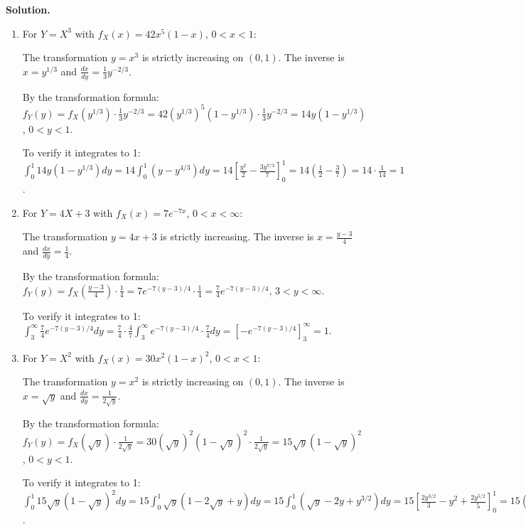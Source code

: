 \noindent\textbf{Solution.}
\begin{enumerate}[label=(\alph*)]
    \item For $Y = X^3$ with $f_X(x) = 42x^5(1-x)$, $0 < x < 1$:
    
    The transformation $y = x^3$ is strictly increasing on $(0,1)$. The inverse is $x = y^{1/3}$ and $\frac{dx}{dy} = \frac{1}{3}y^{-2/3}$.
    
    By the transformation formula: $f_Y(y) = f_X(y^{1/3}) \cdot \frac{1}{3}y^{-2/3} = 42(y^{1/3})^5(1-y^{1/3}) \cdot \frac{1}{3}y^{-2/3} = 14y(1-y^{1/3})$, $0 < y < 1$.
    
    To verify it integrates to 1:
    $\int_0^1 14y(1-y^{1/3})dy = 14\int_0^1 (y-y^{4/3})dy = 14\left[\frac{y^2}{2} - \frac{3y^{7/3}}{7}\right]_0^1 = 14\left(\frac{1}{2} - \frac{3}{7}\right) = 14 \cdot \frac{1}{14} = 1$.
    
    \item For $Y = 4X + 3$ with $f_X(x) = 7e^{-7x}$, $0 < x < \infty$:
    
    The transformation $y = 4x + 3$ is strictly increasing. The inverse is $x = \frac{y-3}{4}$ and $\frac{dx}{dy} = \frac{1}{4}$.
    
    By the transformation formula: $f_Y(y) = f_X\left(\frac{y-3}{4}\right) \cdot \frac{1}{4} = 7e^{-7(y-3)/4} \cdot \frac{1}{4} = \frac{7}{4}e^{-7(y-3)/4}$, $3 < y < \infty$.
    
    To verify it integrates to 1:
    $\int_3^\infty \frac{7}{4}e^{-7(y-3)/4}dy = \frac{7}{4} \cdot \frac{4}{7} \int_3^\infty e^{-7(y-3)/4} \cdot \frac{7}{4}dy = \left[-e^{-7(y-3)/4}\right]_3^\infty = 1$.
    
    \item For $Y = X^2$ with $f_X(x) = 30x^2(1-x)^2$, $0 < x < 1$:
    
    The transformation $y = x^2$ is strictly increasing on $(0,1)$. The inverse is $x = \sqrt{y}$ and $\frac{dx}{dy} = \frac{1}{2\sqrt{y}}$.
    
    By the transformation formula: $f_Y(y) = f_X(\sqrt{y}) \cdot \frac{1}{2\sqrt{y}} = 30(\sqrt{y})^2(1-\sqrt{y})^2 \cdot \frac{1}{2\sqrt{y}} = 15\sqrt{y}(1-\sqrt{y})^2$, $0 < y < 1$.
    
    To verify it integrates to 1:
    $\int_0^1 15\sqrt{y}(1-\sqrt{y})^2dy = 15\int_0^1 \sqrt{y}(1-2\sqrt{y}+y)dy = 15\int_0^1 (\sqrt{y}-2y+y^{3/2})dy = 15\left[\frac{2y^{3/2}}{3} - y^2 + \frac{2y^{5/2}}{5}\right]_0^1 = 15\left(\frac{2}{3} - 1 + \frac{2}{5}\right) = 15 \cdot \frac{1}{15} = 1$.
\end{enumerate}


